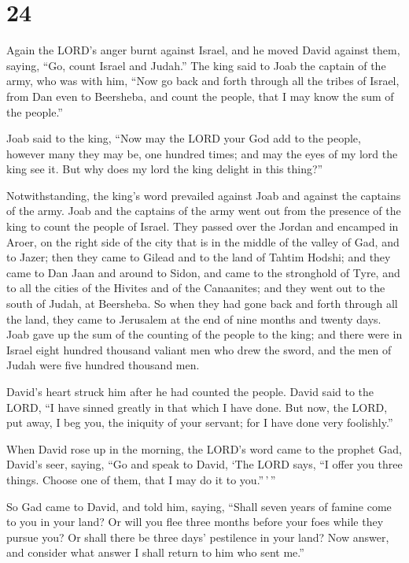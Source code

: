 \hypertarget{section-23}{%
\section{24}\label{section-23}}

 Again the LORD's anger burnt against Israel, and he moved
David against them, saying, ``Go, count Israel and Judah.'' 
The king said to Joab the captain of the army, who was with him, ``Now
go back and forth through all the tribes of Israel, from Dan even to
Beersheba, and count the people, that I may know the sum of the
people.''

 Joab said to the king, ``Now may the LORD your God add to
the people, however many they may be, one hundred times; and may the
eyes of my lord the king see it. But why does my lord the king delight
in this thing?''

 Notwithstanding, the king's word prevailed against Joab and
against the captains of the army. Joab and the captains of the army went
out from the presence of the king to count the people of Israel.
 They passed over the Jordan and encamped in Aroer, on the
right side of the city that is in the middle of the valley of Gad, and
to Jazer;  then they came to Gilead and to the land of
Tahtim Hodshi; and they came to Dan Jaan and around to Sidon,
 and came to the stronghold of Tyre, and to all the cities
of the Hivites and of the Canaanites; and they went out to the south of
Judah, at Beersheba.  So when they had gone back and forth
through all the land, they came to Jerusalem at the end of nine months
and twenty days.  Joab gave up the sum of the counting of
the people to the king; and there were in Israel eight hundred thousand
valiant men who drew the sword, and the men of Judah were five hundred
thousand men.

 David's heart struck him after he had counted the people.
David said to the LORD, ``I have sinned greatly in that which I have
done. But now, the LORD, put away, I beg you, the iniquity of your
servant; for I have done very foolishly.''

 When David rose up in the morning, the LORD's word came to
the prophet Gad, David's seer, saying,  ``Go and speak to
David, `The LORD says, ``I offer you three things. Choose one of them,
that I may do it to you.''\,'\,''

 So Gad came to David, and told him, saying, ``Shall seven
years of famine come to you in your land? Or will you flee three months
before your foes while they pursue you? Or shall there be three days'
pestilence in your land? Now answer, and consider what answer I shall
return to him who sent me.''

